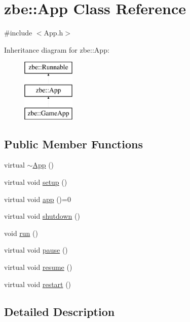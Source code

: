 \hypertarget{classzbe_1_1_app}{}\section{zbe\+:\+:App Class Reference}
\label{classzbe_1_1_app}


{\ttfamily \#include $<$App.\+h$>$}

Inheritance diagram for zbe\+:\+:App\+:\begin{figure}[H]
\begin{center}
\leavevmode
\includegraphics[height=3.000000cm]{classzbe_1_1_app}
\end{center}
\end{figure}
\subsection*{Public Member Functions}
\begin{DoxyCompactItemize}
\item 
virtual \hyperlink{classzbe_1_1_app_aabadd61b8978ed76690b89a3990389bc}{$\sim$\+App} ()
\item 
virtual void \hyperlink{classzbe_1_1_app_aa011954db631225be8e26af69ce3f21d}{setup} ()
\item 
virtual void \hyperlink{classzbe_1_1_app_ac66aa5f4083b6c2c11bbbe9dccde4b3b}{app} ()=0
\item 
virtual void \hyperlink{classzbe_1_1_app_a11ecb4eb1dddde6e7450ac5d3f37a78c}{shutdown} ()
\item 
void \hyperlink{classzbe_1_1_app_ac952b75e2efcf5c2967da60dd95b57e6}{run} ()
\item 
virtual void \hyperlink{classzbe_1_1_app_a4d4f1df38c315ff983c9be55b9e81ea3}{pause} ()
\item 
virtual void \hyperlink{classzbe_1_1_app_ae594070a4566ce4bee010be64b8ff24d}{resume} ()
\item 
virtual void \hyperlink{classzbe_1_1_app_acc49c52714ffe0aff04b3252225cceec}{restart} ()
\end{DoxyCompactItemize}


\subsection{Detailed Description}



